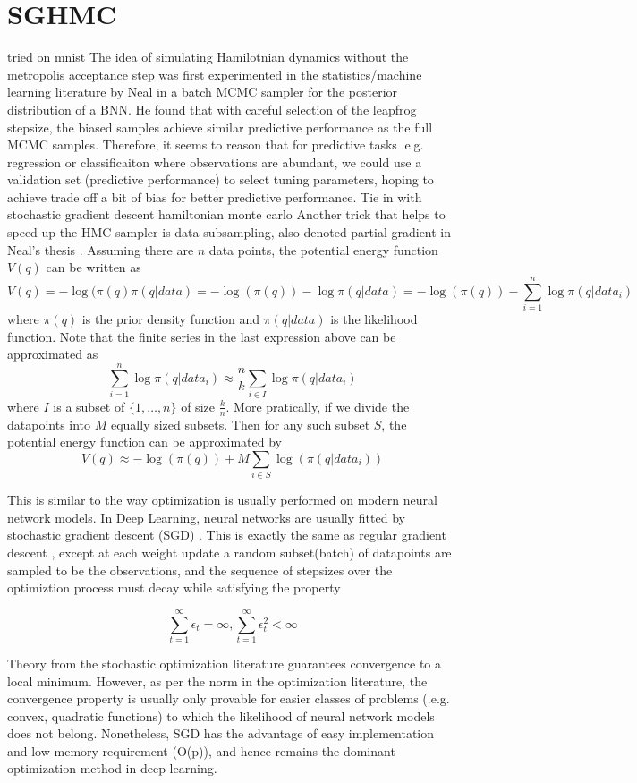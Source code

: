 \documentclass[]{report}
\begin{document}
\section{SGHMC}
tried on mnist
The idea of simulating Hamilotnian dynamics without the metropolis acceptance step was first experimented in the statistics/machine learning literature by Neal \cite{neal1993bayesian} in a batch MCMC sampler for the posterior distribution of a BNN. He found that with careful selection of the leapfrog stepsize, the biased samples achieve similar predictive performance as the full MCMC samples. Therefore, it seems to reason that for predictive tasks .e.g. regression or classificaiton where observations are abundant, we could 
use a validation set (predictive performance) to select tuning parameters, hoping to achieve trade off a bit of bias for better predictive performance. 
Tie in with stochastic gradient descent hamiltonian monte carlo
Another trick that helps to speed up the HMC sampler is data subsampling, also denoted partial gradient in Neal's thesis \cite{neal2012bayesian}.
Assuming there are $n$ data points, the potential energy function $V(q)$ can be written as 
\[ V(q) = -\log( \pi(q) \pi(q|data) = -\log(\pi(q)) -\log \pi(q|data) = -\log(\pi(q)) - \sum_{i=1}^n \log \pi(q|data_i) \]
where $\pi(q)$ is the prior density function and $\pi(q|data)$ is the likelihood function. Note that the finite series in the last expression above can be approximated as 
\[ \sum_{i=1}^n \log \pi(q|data_i) \approx \frac{n}{k} \sum_{i \in I} \log \pi(q|data_i) \]
where $I$ is a subset of $\{1,\dots, n\}$ of size $\frac{k}{n}$. 
More pratically, if we divide the datapoints into $M$ equally sized subsets. Then for any such subset $S$, the potential energy function can be approximated by 
\[ V(q) \approx    -\log(\pi(q)) + M \sum_{i \in S} \log(\pi(q|data_i)) \]

This is similar to the way optimization is usually performed on modern neural network models. 
In Deep Learning, neural networks are usually fitted by stochastic gradient descent (SGD) \cite{ngiam2011optimization}.
This is exactly the same as regular gradient descent \cite{wright1999numerical}, except at each weight update a random subset(batch) of datapoints are sampled to be the  observations, and the sequence of stepsizes over the optimiztion process must decay while satisfying the property

\[ \sum_{t=1}^\infty \epsilon_t = \infty , \sum_{t=1}^\infty \epsilon_t^2 < \infty \]

Theory from the stochastic optimization literature \cite{robbins1951stochastic} guarantees convergence to a local minimum. However, as per the norm in the optimization literature, the convergence property is usually only provable for easier classes of problems (.e.g. convex, quadratic functions) to which the likelihood of neural network models does not belong. Nonetheless, SGD has the advantage of easy implementation and low memory requirement (O(p)), and hence remains the dominant optimization method in deep learning.  
\end{document}
